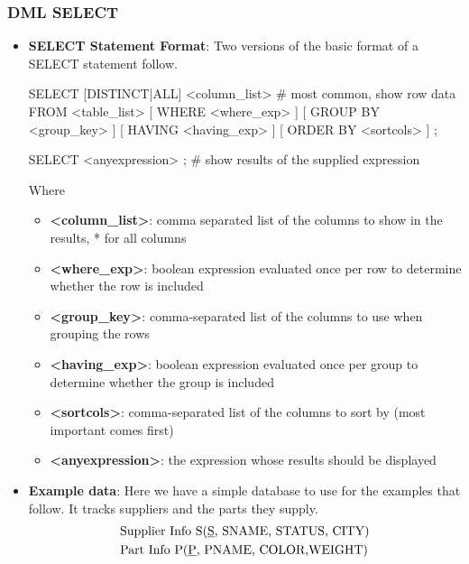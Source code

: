 \documentclass{report}
\begin{document}
    \pagebreak 
    \subsubsection{DML SELECT}
    \begin{itemize}
        \item \textbf{SELECT Statement Format}: Two versions of the basic format of a SELECT statement follow.
            \bigbreak \noindent 
            \begin{sqlcode}
                SELECT [DISTINCT|ALL] <column_list> # most common, show row data
                    FROM <table_list>
                    [ WHERE <where_exp> ]
                    [ GROUP BY <group_key> ]
                    [ HAVING <having_exp> ]
                    [ ORDER BY <sortcols> ] ;

                SELECT <anyexpression> ; # show results of the supplied expression
            \end{sqlcode}
            Where
            \begin{itemize}
                \item \textbf{<column\_list>}: comma separated list of the columns to show in the results, * for all columns
                \item \textbf{<where\_exp>}: boolean expression evaluated once per row to determine whether the row is included
                \item \textbf{<group\_key>}: comma-separated list of the columns to use when grouping the rows
                \item \textbf{<having\_exp>}: boolean expression evaluated once per group to determine whether the group is included
                \item \textbf{<sortcols>}: comma-separated list of the columns to sort by (most important comes first)
                \item \textbf{<anyexpression>}: the expression whose results should be displayed
            \end{itemize}
        \item \textbf{Example data}: Here we have a simple database to use for the examples that follow. It tracks suppliers and the parts they supply.
            \bigbreak \noindent 
            \begin{align*}
                &\text{Supplier Info S(\underline{S}, SNAME, STATUS, CITY)} \\
                &\text{Part Info P(\underline{P}, PNAME, COLOR,WEIGHT)} \\

\end{align*}
\end{itemize}
\end{document}
